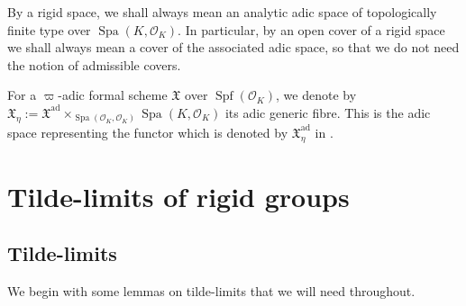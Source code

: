 \documentclass[10pt,oneside]{amsart}
\theoremstyle{definition}
\begin{document}
	By a rigid space, we shall always mean an analytic adic space of topologically finite type over $\operatorname{Spa}(K,\mathcal O_K)$. 
	In particular, by an open cover of a rigid space we shall always mean a cover of the associated adic space, so that we do not need the notion of admissible covers.
	
	For a $\varpi$-adic formal scheme $\mathfrak X$ over $\operatorname{Spf}(\mathcal O_K)$, we denote by $\mathfrak X_\eta:=\mathfrak X^{\mathrm{ad}}\times_{\operatorname{Spa}(\mathcal O_K,\mathcal O_K)}\operatorname{Spa}(K,\mathcal O_K)$ its adic generic fibre. This is the adic space representing the functor which is denoted by  $\mathfrak X^{\mathrm{ad}}_{\eta}$ in \cite{SW}.


	
	\section{Tilde-limits of rigid groups} \label{section:tilde_limit}
  
	

		\subsection{Tilde-limits} 
	We begin with some lemmas on tilde-limits that we will need throughout.
		
\end{document}
